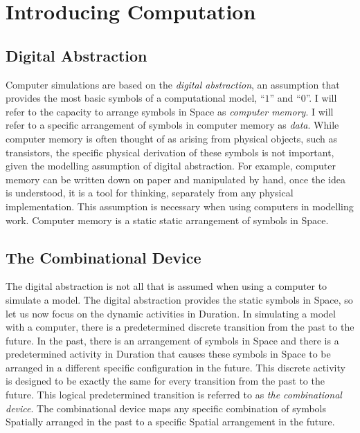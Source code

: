 \chapter{Introducing Computation}
\label{chapter:introducing_computation}

\section{Digital Abstraction}

Computer simulations are based on the \emph{digital abstraction}, an
assumption that provides the most basic symbols of a computational
model, ``$1$'' and ``$0$''.  I will refer to the capacity to arrange
symbols in Space as \emph{computer memory}.  I will refer to a
specific arrangement of symbols in computer memory as \emph{data}.
While computer memory is often thought of as arising from physical
objects, such as transistors, the specific physical derivation of
these symbols is not important, given the modelling assumption of
digital abstraction.  For example, computer memory can be written down
on paper and manipulated by hand, once the idea is understood, it is a
tool for thinking, separately from any physical implementation.  This
assumption is necessary when using computers in modelling work.
Computer memory is a static static arrangement of symbols in Space.

\section{The Combinational Device}

The digital abstraction is not all that is assumed when using a
computer to simulate a model.  The digital abstraction provides the
static symbols in Space, so let us now focus on the dynamic activities
in Duration.  In simulating a model with a computer, there is a
predetermined discrete transition from the past to the future.  In the
past, there is an arrangement of symbols in Space and there is a
predetermined activity in Duration that causes these symbols in Space
to be arranged in a different specific configuration in the future.
This discrete activity is designed to be exactly the same for every
transition from the past to the future.  This logical predetermined
transition is referred to as \emph{the combinational device}.  The
combinational device maps any specific combination of symbols
Spatially arranged in the past to a specific Spatial arrangement in
the future.

